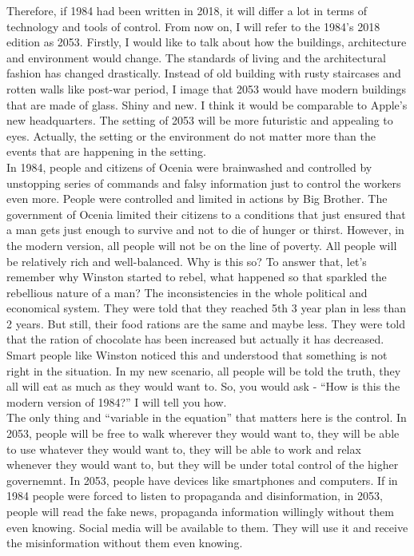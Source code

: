 \documentclass[a4paper,12pt]{article}
\begin{document}
Therefore, if 1984 had been written in 2018, it will differ a lot in terms of technology and tools of control. From now on, I will refer to the 1984's 2018 edition as 2053. Firstly, I would like to talk about how the buildings, architecture and environment would change. The standards of living and the architectural fashion has changed drastically. Instead of old building with rusty staircases and rotten walls like post-war period, I image that 2053 would have modern buildings that are made of glass. Shiny and new. I think it would be comparable to Apple's new headquarters.\cite{apple} The setting of 2053 will be more futuristic and appealing to eyes. Actually, the setting or the environment do not matter more than the events that are happening in the setting. \\
 







In 1984, people and citizens of Ocenia were brainwashed and controlled by unstopping series of commands and falsy information just to control the workers even more. People were controlled and limited in actions by Big Brother. The government of Ocenia limited their citizens to a conditions that just ensured that a man gets just enough to survive and not to die of hunger or thirst. However, in the modern version, all people will not be on the line of poverty. All people will be relatively rich and well-balanced. Why is this so? To answer that, let's remember why Winston started to rebel, what happened so that sparkled the rebellious nature of a man? The inconsistencies in the whole political and economical system. They were told that they reached 5th 3 year plan in less than 2 years. But still, their food rations are the same and maybe less. They were told that the ration of chocolate has been increased but actually it has decreased. Smart people like Winston noticed this and understood that something is not right in the situation. In my new scenario, all people will be told the truth, they all will eat as much as they would want to. So, you would ask - ``How is this the modern version of 1984?'' I will tell you how.\\

The only thing and ``variable in the equation'' that matters here is the control. In 2053, people will be free to walk wherever they would want to, they will be able to use whatever they would want to, they will be able to work and relax whenever they would want to, but they will be under total control of the higher governemnt. In 2053, people have devices like smartphones and computers. If in 1984 people were forced to listen to propaganda and disinformation, in 2053, people will read the fake news, propaganda information willingly without them even knowing. Social media will be available to them. They will use it and receive the misinformation without them even knowing.\\
\end{document}
